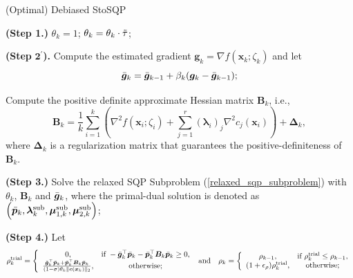 \documentclass[aos]{imsart}
\numberwithin{equation}{section}
\theoremstyle{plain}
\begin{document}
\begin{algorithm}[htb]
 \caption{(Optimal) Debiased StoSQP}
 \label{alg_stoch_relaxed_sqp_averaging_grad_Bk}
 \begin{algorithmic}[1]
 \renewcommand{\algorithmicrequire}{\textbf{Input:} $\bm{\ell} \leq \bm{x}_0 \leq \bm{u}$, $\tau, \Tilde{\tau} \in (0,1)$, $\sigma \in (0,1)$, $\rho_{-1} >0$, $\epsilon_{\rho}, \epsilon_{\xi}, \beta \in (0,1)$, $\mu \in (0,1)$, $\varrho>0$, $\{\beta_k\}_{k=0}^{\infty}$, $\{\gamma_k\}_{k=0}^{\infty}$.}
 \REQUIRE 
  \STATE \textbf{(Step 1.)} $\theta_k = 1$;
  \STATE $\theta_k = \theta_k \cdot \Tilde{\tau}$;

  \ENDWHILE

  \STATE \textbf{(Step} $\mathbf{2^{\prime}}$\textbf{).} Compute the estimated gradient $\bm{g}_k = \nabla f(\bm{x}_k; \zeta_{k})$ and let 
  \begin{equation*}
      \Bar{\bm{g}}_k = \Bar{\bm{g}}_{k-1} + \beta_k (\bm{g}_k - \Bar{\bm{g}}_{k-1});
  \end{equation*}

  \STATE Compute the positive definite approximate Hessian matrix $\bm{B}_k$, i.e., \begin{equation*}
        \bm{B}_k = \frac{1}{k} \sum_{i=1}^{k} \left( \nabla^2 f(\bm{x}_i; \zeta_{i}) + \sum_{j=1}^{r} \left( \bm{\lambda}_{i}\right)_{j}\nabla^2 c_j(\bm{x}_{i})\right) + \bm{\Delta}_k,
\end{equation*}
 where $\bm{\Delta}_k$ is a regularization matrix that guarantees the positive-definiteness of $\bm{B}_k$. 
  
  \STATE \textbf{(Step 3.)} Solve the relaxed SQP Subproblem (\ref{relaxed_sqp_subproblem}) with $\theta_k$, $\bm{B}_k$ and $\Bar{\bm{g}}_{k}$, where the primal-dual solution is denoted as $\left(\Bar{\bm{p}}_k,  \bm{\lambda}_k^{\text{sub}}, \bm{\mu}_{1,k}^{\text{sub}}, \bm{\mu}_{2,k}^{\text{sub}} \right)$;

  \STATE \textbf{(Step 4.)} Let \begin{equation*}
        \rho_k^{\text{trial}} = \left \{ \begin{array}{cc}
           0,  & \text{if}~ -\Bar{\bm{g}}_k^{\top} \Bar{\bm{p}}_k - \Bar{\bm{p}}_k^{\top} \bm{B}_k \Bar{\bm{p}}_k \geq 0, \\
           \frac{\Bar{\bm{g}}_k^{\top} \Bar{\bm{p}}_k + \Bar{\bm{p}}_k^{\top} \bm{B}_k \Bar{\bm{p}}_k}{(1-\sigma)\theta_k \|\bm{c}(\bm{x}_k)\|_2},  &  \text{otherwise;}
        \end{array}\right.
        ~\text{and} \quad 
         \rho_k = \left\{ \begin{array}{cc}
        \rho_{k-1}, &  \text{if}~\rho_{k}^{\text{trial}} \leq \rho_{k-1}, \\
        (1+\epsilon_{\rho})\rho_{k}^{\text{trial}}, & \text{otherwise};
    \end{array} \right.
         \end{equation*}


\end{algorithmic}
\end{algorithm}
\end{document}
